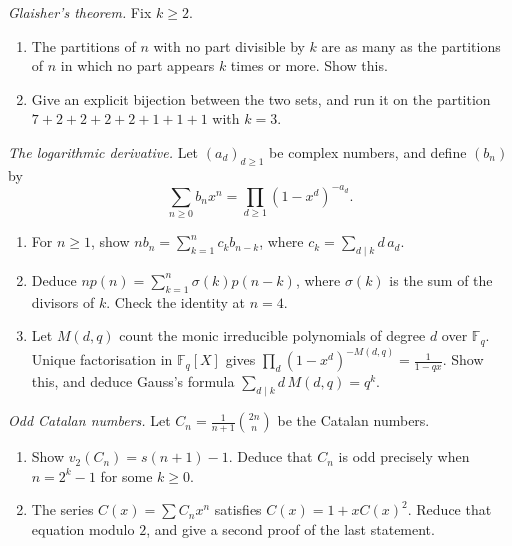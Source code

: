 \begin{exercise}[$\star\star$]\label{pb:glaisherthm}
\emph{Glaisher's theorem.} Fix $k\ge2$.
\begin{enumerate}[label=(\alph*)]
\item The partitions of $n$ with no part divisible by $k$ are as many as the partitions of $n$ in which no part
appears $k$ times or more. Show this.
\item Give an explicit bijection between the two sets, and run it on the partition $7+2+2+2+2+1+1+1$ with $k=3$.
\end{enumerate}
\end{exercise}

\begin{exercise}[$\star\star$]\label{pb:eulerlog}
\emph{The logarithmic derivative.} Let $(a_d)_{d\ge1}$ be complex numbers, and define $(b_n)$ by
\[
\sum_{n\ge0}b_nx^n=\prod_{d\ge1}(1-x^d)^{-a_d}.
\]
\begin{enumerate}[label=(\alph*)]
\item For $n\ge1$, show $nb_n=\sum_{k=1}^nc_kb_{n-k}$, where $c_k=\sum_{d\mid k}d\,a_d$.
\item Deduce $np(n)=\sum_{k=1}^n\sigma(k)p(n-k)$, where $\sigma(k)$ is the sum of the divisors of $k$. Check the identity at $n=4$.
\item Let $M(d,q)$ count the monic irreducible polynomials of degree $d$ over $\mathbb F_q$. Unique factorisation in
$\mathbb F_q[X]$ gives $\prod_d(1-x^d)^{-M(d,q)}=\frac1{1-qx}$. Show this, and deduce Gauss's formula $\sum_{d\mid k}d\,M(d,q)=q^k$.
\end{enumerate}
\end{exercise}

\begin{exercise}[$\star\star$]\label{pb:catalanodd}
\emph{Odd Catalan numbers.} Let $C_n=\frac1{n+1}\binom{2n}n$ be the Catalan numbers.
\begin{enumerate}[label=(\alph*)]
\item Show $v_2(C_n)=s(n+1)-1$. Deduce that $C_n$ is odd precisely when $n=2^k-1$ for some $k\ge0$.
\item The series $C(x)=\sum C_nx^n$ satisfies $C(x)=1+xC(x)^2$. Reduce that equation modulo $2$, and give a second proof of the last statement.
\end{enumerate}
\end{exercise}

